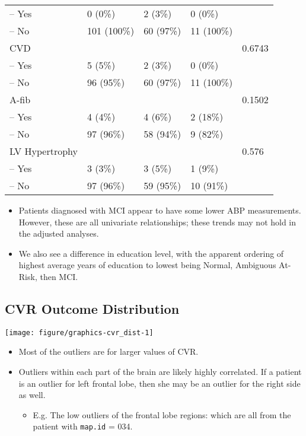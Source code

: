 \documentclass[10pt]{article}\usepackage[]{graphicx}\usepackage[]{color}
\makeatletter
\def\maxwidth{ %
  \ifdim\Gin@nat@width>\linewidth
    \linewidth
  \else
    \Gin@nat@width
  \fi
}
\newenvironment{knitrout}{}{} %
\newcommand{\code}[1]{\texttt{\smaller #1}}
\makeatother
\begin{document}
\begin{table}[ht]
\begin{tabular}{lllll}
  -- Yes & 0 (0\%) & 2 (3\%) & 0 (0\%) &  \\ 
  -- No & 101 (100\%) & 60 (97\%) & 11 (100\%) &  \\ 
  CVD &  &  &  & 0.6743 \\ 
  -- Yes & 5 (5\%) & 2 (3\%) & 0 (0\%) &  \\ 
  -- No & 96 (95\%) & 60 (97\%) & 11 (100\%) &  \\ 
  A-fib &  &  &  & 0.1502 \\ 
  -- Yes & 4 (4\%) & 4 (6\%) & 2 (18\%) &  \\ 
  -- No & 97 (96\%) & 58 (94\%) & 9 (82\%) &  \\ 
  LV Hypertrophy &  &  &  & 0.576 \\ 
  -- Yes & 3 (3\%) & 3 (5\%) & 1 (9\%) &  \\ 
  -- No & 97 (96\%) & 59 (95\%) & 10 (91\%) &  \\ 
   \bottomrule
\end{tabular}
\end{table}




\begin{itemize}
  \item Patients diagnosed with MCI appear to have some lower ABP measurements. However, these are all univariate relationships; these trends may not hold in the adjusted analyses.
  \item We also see a difference in education level, with the apparent ordering of highest average years of education to lowest being Normal, Ambiguous At-Risk, then MCI.
\end{itemize}

\clearpage
\subsection{CVR Outcome Distribution}

\begin{knitrout}
\color{fgcolor}

{\centering \texttt{[image: figure/graphics-cvr\_dist-1]} 

}



\end{knitrout}


\begin{itemize}
  \item Most of the outliers are for larger values of CVR. 
  \item Outliers within each part of the brain are likely highly correlated. If a patient is an outlier for left frontal lobe, then she may be an outlier for the right side as well. 
  \begin{itemize}
    \item E.g. The low outliers of the frontal lobe regions: which are all from the patient with \code{map.id} = 034.
  \end{itemize}
\end{itemize}
\end{document}
